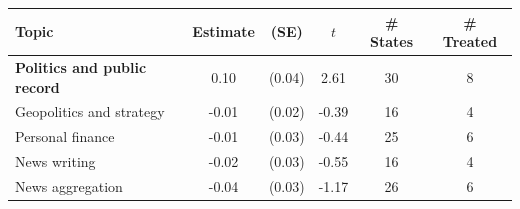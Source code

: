\begin{tabular}{lccccc}
\toprule \toprule
Topic & Estimate & (SE) & $t$ & \# States & \# Treated \\
\midrule
\textbf{Politics and public record} & 0.10 & (0.04) & 2.61 & 30 & 8 \\
Geopolitics and strategy & -0.01 & (0.02) & -0.39 & 16 & 4 \\
Personal finance & -0.01 & (0.03) & -0.44 & 25 & 6 \\
News writing & -0.02 & (0.03) & -0.55 & 16 & 4 \\
News aggregation & -0.04 & (0.03) & -1.17 & 26 & 6 \\
\bottomrule \bottomrule
\end{tabular}
